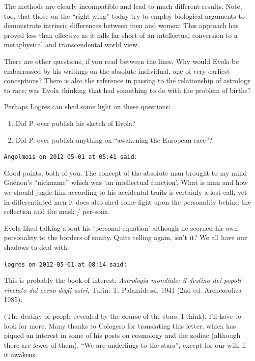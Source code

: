 \begin{footnotesize}
\begin{sffamily}
The methods are clearly incompatible and lead to much different results. Note, too, that those on the ``right wing'' today try to employ biological arguments to demonstrate intrinsic differences between men and women. This approach has proved less than effective as it falls far short of an intellectual conversion to a metaphysical and transcendental world view.

There are other questions, if you read between the lines. Why would Evola be embarrassed by his writings on the absolute individual, one of very earliest conceptions? There is also the reference in passing to the relationship of astrology to race; was Evola thinking that had something to do with the problem of births?

Perhaps Logres can shed some light on these questions:

\begin{enumerate}


\item Did P. ever publish his sketch of Evola?

\item Did P. ever publish anything on ``awakening the European race''?
\end{enumerate}


\hfill

\texttt{Angolmois on 2012-05-01 at 05:41 said:}

Good points, both of you. The concept of the absolute man brought to my mind Guénon's ``nickname'' which was `an intellectual function'. What is man and how we should jugde him according to his accidental traits is certainly a lost call, yet in differentiated men it does also shed some light upon the personality behind the reflection and the mask / per-sona.

Evola liked talking about his `personal equation' although he scorned his own personality to the borders of sanity. Quite telling again, isn't it? We all have our shadows to deal with.

\hfill

\texttt{logres on 2012-05-01 at 08:14 said:}

This is probably the book of interest: \textit{Astrologia mondiale: il destino dei popoli rivelato dal corso degli astri}, Turin: T. Palamidessi, 1941 (2nd ed. Archeosofica 1985).

(The destiny of people revealed by the course of the stars, I think). I'll have to look for more. Many thanks to Cologero for translating this letter, which has piqued an interest in some of his posts on cosmology and the zodiac (although there are fewer of them). ``We are underlings to the stars'', except for our will, if it awakens.


\end{sffamily}
\end{footnotesize}
